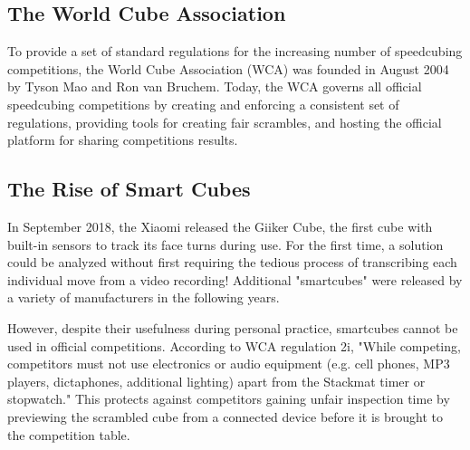 \subsection{The World Cube Association}
\label{subsec:the-world-cube-association}

To provide a set of standard regulations for the increasing number of
speedcubing competitions, the World Cube Association (WCA) was founded
in August 2004 by Tyson Mao and Ron van Bruchem. Today, the WCA governs
all official speedcubing competitions by creating and enforcing a
consistent set of regulations, providing tools for creating fair
scrambles, and hosting the official platform for sharing competitions
results. \cite{wca-speedcubing-history}

\subsection{The Rise of Smart Cubes}
\label{subsec:the-rise-of-smart-cubes}

In September 2018, the Xiaomi released the Giiker Cube, the first cube
with built-in sensors to track its face turns during use.
\cite{giiker-thecubicle} For the first time, a solution could be
analyzed without first requiring the tedious process of transcribing
each individual move from a video recording! Additional "smartcubes"
were released by a variety of manufacturers in the following years.
\cite{gocube-product-launch-video} \cite{gans356i-thecubicle}
\cite{gocube-rubiksconnected}

However, despite their usefulness during personal practice, smartcubes
cannot be used in official competitions. According to WCA regulation
2i, "While competing, competitors must not use electronics or audio
equipment (e.g. cell phones, MP3 players, dictaphones, additional
lighting) apart from the Stackmat timer or stopwatch."
\cite{wca-regulations} This protects against competitors gaining unfair
inspection time by previewing the scrambled cube from a connected
device before it is brought to the competition table.

